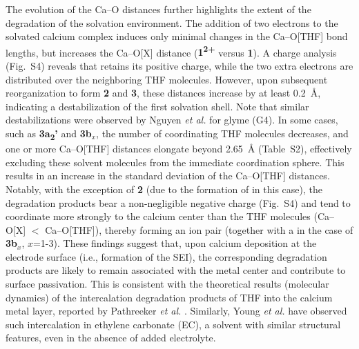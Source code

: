 \documentclass[twoside,twocolumn,9pt]{article}
\begin{document}
{The evolution of the Ca--O distances further highlights the extent of the degradation of the solvation environment. The addition of two electrons to the solvated calcium complex induces only minimal changes in the Ca--O[THF] bond lengths, but increases the Ca--O[X] distance (\textbf{1\textsuperscript{2+}} versus \textbf{1}).  
A charge analysis (Fig.~S4) reveals that  retains its positive charge, while the two extra electrons are distributed over the neighboring THF molecules.  
However, upon subsequent reorganization to form \textbf{2} and \textbf{3}, these distances increase by at least \SI{0.2}{\angstrom}, indicating a destabilization of the first solvation shell.  
Note that similar destabilizations were observed by Nguyen \textit{et al.} for glyme (G4)\cite{nguyenSolvationReductionCoupling2023}.
In some cases, such as \textbf{3a\textsubscript{2}'} and \textbf{3b}$_x$, the number of coordinating THF molecules decreases, and one or more Ca--O[THF] distances elongate beyond \SI{2.65}{\angstrom} (Table~S2), effectively excluding these solvent molecules from the immediate coordination sphere. This results in an increase in the standard deviation of the Ca--O[THF] distances.  
Notably, with the exception of \textbf{2} (due to the formation of  in this case), the degradation products bear a non-negligible negative charge (Fig.~S4) and tend to coordinate more strongly to the calcium center than the THF molecules (Ca--O[X] $<$ Ca--O[THF]), thereby forming an ion pair (together with a  in the case of \textbf{3b$_x$}, $x$=1-3).  
These findings suggest that, upon calcium deposition at the electrode surface (i.e., formation of the SEI), the corresponding degradation products are likely to remain associated with the metal center and contribute to surface passivation.
This is consistent  with the theoretical results (molecular dynamics) of the intercalation degradation products of THF into the calcium metal layer, reported by Pathreeker \textit{et al.} \cite{pathreekerWhyTetrahydrofuranGood2021}. 
Similarly, Young \textit{et al.}  \cite{youngEthyleneCarbonateBasedElectrolyte2018} have observed such intercalation in ethylene carbonate (EC), a solvent with similar structural features, even in the absence of added electrolyte.

}
\end{document}
